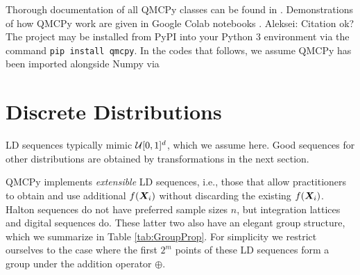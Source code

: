 \documentclass[graybox,footinfo]{svmult}
\newcommand{\AGSComment}[1]{{\color{cyan} Aleksei: #1}}
\begin{document}
Thorough documentation of all QMCPy classes can be found in \cite{QMCPyDocs}. Demonstrations of how QMCPy work are given in Google Colab notebooks \cite{QMCPyTutColab2020,QMCPyTutColab2020_paper}. \AGSComment{Citation \cite{QMCPyTutColab2020_paper} ok?} The project may be installed from PyPI into your Python 3 environment via the command \texttt{pip install qmcpy}. In the codes that follows, we assume QMCPy has been imported alongside Numpy \cite{numpy} 
via


\section{Discrete Distributions}

LD sequences typically mimic ${\mathcal{U}}[0,1]^d$, which we assume here.  Good sequences for other distributions are obtained by transformations in the next section.  

QMCPy implements \emph{extensible} LD sequences, i.e., those that allow practitioners to obtain and use additional $f({\boldsymbol{X}}_i)$ without discarding the existing $f({\boldsymbol{X}}_i)$.  Halton sequences do not have preferred sample sizes $n$, but integration lattices and digital sequences do.  These latter two also have an elegant group structure, which we summarize in Table \ref{tab:GroupProp}.  For simplicity we restrict ourselves to the case where the first $2^m$ points of these LD sequences form a group under the addition operator $\oplus$.
\end{document}
